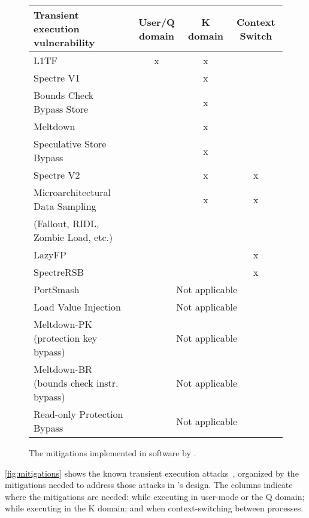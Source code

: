 \begin{figure}
\centering
\small
\begin{tabular}{lccc}
{\bf Transient execution vulnerability} & {\bf User/Q domain} & {\bf K domain} & {\bf Context Switch} \\

\midrule
L1TF & x & x & \\

\midrule
Spectre V1 & & x & \\
Bounds Check Bypass Store & & x &\\
Meltdown && x &\\
Speculative Store Bypass &	 & x &  \\

\midrule
Spectre V2 & & x & x \\
Microarchitectural Data Sampling && x & x\\
\qquad (Fallout, RIDL, Zombie Load, etc.) \\

\midrule

LazyFP &&& x \\
SpectreRSB &&& x\\

\midrule
PortSmash & \multicolumn{3}{c}{Not applicable} \\
Load Value Injection & \multicolumn{3}{c}{Not applicable} \\
Meltdown-PK (protection key bypass) & \multicolumn{3}{c}{Not applicable} \\
Meltdown-BR (bounds check instr. bypass) & \multicolumn{3}{c}{Not applicable} \\
Read-only Protection Bypass & \multicolumn{3}{c}{Not applicable} \\

\end{tabular}
\caption{The mitigations implemented in software by \sys{}.}
\label{fig:mitigations}
\end{figure}

\autoref{fig:mitigations} shows the known transient execution
attacks~\cite{hill:survey,sok:transient}, organized by the mitigations
needed to address those attacks in \sys's design.  The columns indicate where the mitigations are needed: while
executing in user-mode or the Q domain; while executing in the K domain;
and when context-switching between processes.


